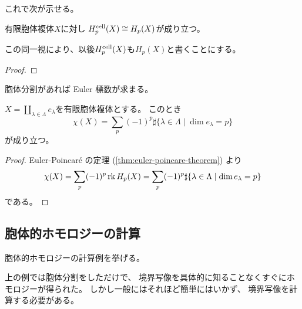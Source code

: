 \documentclass[report]{jlreq}
\begin{document}
これで次が示せる。

\begin{theorem}[特異ホモロジーと胞体的ホモロジーの同型]
    有限胞体複体$X$に対し
    $H^{\mathrm{cell}}_p(X) \cong H_p(X)$が成り立つ。
\end{theorem}

\begin{remark}
    この同一視により、以後$H^{\mathrm{cell}}_p(X)$も$H_p(X)$と書くことにする。
\end{remark}

\begin{proof}
    \TODO{}
\end{proof}

胞体分割があれば Euler 標数が求まる。

\begin{theorem}
    $X = \coprod_{\lambda \in \Lambda} e_\lambda$を有限胞体複体とする。
    このとき
    \begin{equation}
        \chi(X) = \sum_{p} (-1)^p \sharp \{
            \lambda \in \Lambda
            \mid
            \dim e_\lambda = p
        \}
    \end{equation}
    が成り立つ。
\end{theorem}

\begin{proof}
    Euler-Poincar\'e の定理
    (\cref{thm:euler-poincare-theorem}) より
    \begin{equation}
        \chi(X)
            = \sum_p (-1)^p \operatorname{rk} H_p(X)
            = \sum_{p} (-1)^p \sharp \{
                \lambda \in \Lambda
                \mid
                \dim e_\lambda = p
            \}
    \end{equation}
    である。
\end{proof}



\subsection{胞体的ホモロジーの計算}

胞体的ホモロジーの計算例を挙げる。

\begin{example}[複素射影空間]
    \TODO{}
\end{example}

上の例では胞体分割をしただけで、
境界写像を具体的に知ることなくすぐにホモロジーが得られた。
しかし一般にはそれほど簡単にはいかず、
境界写像を計算する必要がある。
\end{document}
